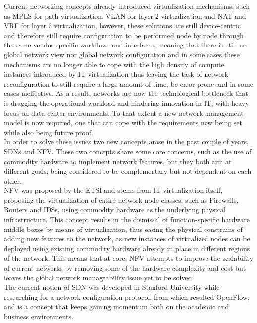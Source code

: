 %
Current networking concepts already introduced virtualization mechanisms, such as \gls{MPLS} for path virtualization, \gls{VLAN} for layer 2 virtualization and \gls{NAT} and \gls{VRF} for layer 3 virtualization\cite{Kreutz2014}, however, these solutions are still device-centric and therefore still require configuration to be performed node by node through the same vendor specific workflows and interfaces, meaning that there is still no global network view nor global network configuration\cite{Kreutz2014} and in some cases these mechanisms are no longer able to cope with the high density of compute instances introduced by \gls{IT} virtualization \cite{Duffy2012} thus leaving the task of network reconfiguration to still require a large amount of time, be error prone and in some cases ineffective.
As a result, networks are now the technological bottleneck that is dragging the operational workload and hindering innovation in \gls{IT}, with heavy focus on data center environments.
To that extent a new network management model is now required, one that can cope with the requirements now being set while also being future proof.\\
%
In order to solve these issues two new concepts arose in the past couple of years, \glspl{SDN} and \gls{NFV}.
These two concepts share some core concerns, such as the use of commodity hardware to implement network features, but they both aim at different goals, being considered to be complementary but not dependent on each other\cite{ETSI2014}\cite{Pate2013}.\\
%
\gls{NFV} was proposed by the \gls{ETSI} and stems from \gls{IT} virtualization itself, proposing the virtualization of entire network node classes, such as Firewalls, Routers and \glspl{IDS}, using commodity hardware as the underlying physical infrastructure.
This concept results in the dismissal of function-specific hardware middle boxes by means of virtualization, thus easing the physical constrains of adding new features to the network, as new instances of virtualized nodes can be deployed using existing commodity hardware already in place in different regions of the network\cite{ETSI2014}.
This means that at core, \gls{NFV} attempts to improve the scalability of current networks by removing some of the hardware complexity and cost but leaves the global network manageability issue yet to be solved.\\
%
The current notion of \gls{SDN} was developed in Stanford University while researching for a network configuration protocol, from which resulted OpenFlow, and is a concept that keeps gaining momentum both on the academic and business environments.
